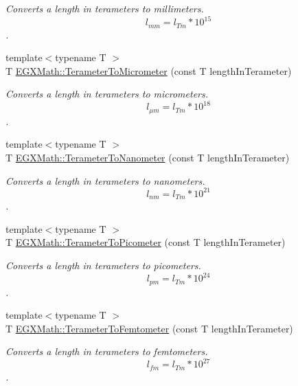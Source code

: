 \begin{DoxyCompactItemize}
\begin{DoxyCompactList}\small\item\em Converts a length in terameters to millimeters. \[ l_{mm}=l_{Tm} * 10^{15} \]. \end{DoxyCompactList}\item 
{\footnotesize template$<$typename T $>$ }\\T \mbox{\hyperlink{group___e_g_x_math-_conversions-_length_conversions-_s_i-_terameter-_s_i_ga4f6fb943e4c16178f4060c01a9c00a02}{E\+G\+X\+Math\+::\+Terameter\+To\+Micrometer}} (const T length\+In\+Terameter)
\begin{DoxyCompactList}\small\item\em Converts a length in terameters to micrometers. \[ l_{\mu m}=l_{Tm} * 10^{18} \]. \end{DoxyCompactList}\item 
{\footnotesize template$<$typename T $>$ }\\T \mbox{\hyperlink{group___e_g_x_math-_conversions-_length_conversions-_s_i-_terameter-_s_i_ga01da3f80c1d7cf73956140fa84ad615c}{E\+G\+X\+Math\+::\+Terameter\+To\+Nanometer}} (const T length\+In\+Terameter)
\begin{DoxyCompactList}\small\item\em Converts a length in terameters to nanometers. \[ l_{nm}=l_{Tm} * 10^{21} \]. \end{DoxyCompactList}\item 
{\footnotesize template$<$typename T $>$ }\\T \mbox{\hyperlink{group___e_g_x_math-_conversions-_length_conversions-_s_i-_terameter-_s_i_ga131f3ccf4db05a31f5bd5c9487da9a4e}{E\+G\+X\+Math\+::\+Terameter\+To\+Picometer}} (const T length\+In\+Terameter)
\begin{DoxyCompactList}\small\item\em Converts a length in terameters to picometers. \[ l_{pm}=l_{Tm} * 10^{24} \]. \end{DoxyCompactList}\item 
{\footnotesize template$<$typename T $>$ }\\T \mbox{\hyperlink{group___e_g_x_math-_conversions-_length_conversions-_s_i-_terameter-_s_i_ga3baa4e53ebd4305bc80d9b998720eba5}{E\+G\+X\+Math\+::\+Terameter\+To\+Femtometer}} (const T length\+In\+Terameter)
\begin{DoxyCompactList}\small\item\em Converts a length in terameters to femtometers. \[ l_{fm}=l_{Tm} * 10^{27} \]. \end{DoxyCompactList}\item 

\end{DoxyCompactItemize}
